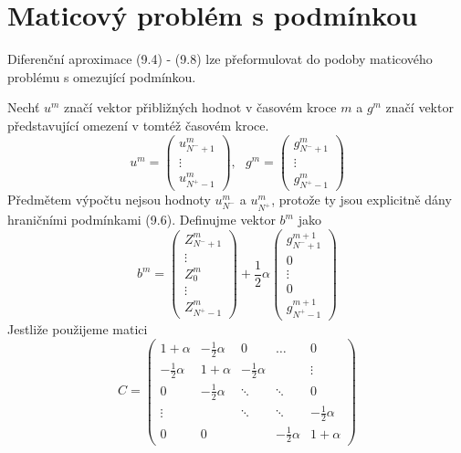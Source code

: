 \documentclass[a4paper]{book}
\begin{document}
\section{Maticový problém s podmínkou}

Diferenční aproximace (9.4) - (9.8) lze přeformulovat do podoby maticového problému s omezující podmínkou.

Nechť $u^m$ značí vektor přibližných hodnot v časovém kroce $m$ a $g^m$ značí vektor představující omezení v tomtéž časovém kroce.
\begin{equation*}
	u^m =
	\begin{pmatrix}
		u_{N^{-}+1}^m \\
		\vdots \\
		u_{N^{+}-1}^m
	\end{pmatrix}
,~~~
	g^m =
	\begin{pmatrix}
		g_{N^{-}+1}^m \\
		\vdots \\
		g_{N^{+}-1}^m
	\end{pmatrix}
\end{equation*}
Předmětem výpočtu nejsou hodnoty $u_{N^{-}}^m$ a $u_{N^{+}}^m$, protože ty jsou explicitně dány hraničními podmínkami (9.6). Definujme vektor $b^m$ jako
\begin{equation*}
b^m =
	\begin{pmatrix}
		Z_{N^{-}+1}^m \\
		\vdots \\
		Z_0^m\\
		\vdots \\
		Z_{N^{+}-1}^m
	\end{pmatrix}
	+ \frac{1}{2} \alpha
		\begin{pmatrix}
		g_{N^{-}+1}^{m+1} \\
		0 \\
		\vdots\\
		0 \\
		g_{N^{+}-1}^{m+1}
	\end{pmatrix}
\end{equation*}
Jestliže použijeme matici
\begin{equation*}
	C =
	\begin{pmatrix}
		1 + \alpha & -\frac{1}{2}\alpha & 0 & \dots & 0 \\
		-\frac{1}{2}\alpha & 1 + \alpha & -\frac{1}{2}\alpha & & \vdots \\
		0 & -\frac{1}{2}\alpha & \ddots & \ddots & 0 \\
		\vdots & & \ddots & \ddots & -\frac{1}{2}\alpha \\
		0 & 0 & & -\frac{1}{2}\alpha & 1 + \alpha
	\end{pmatrix}
\end{equation*}
\end{document}
